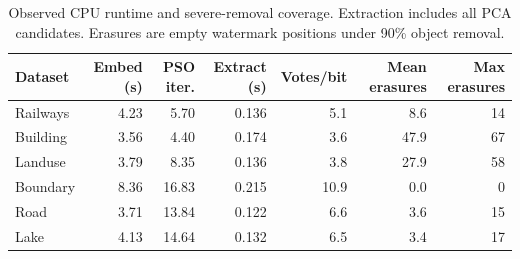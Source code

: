 \begin{table}[!t]
\centering\footnotesize
\caption{Observed CPU runtime and severe-removal coverage. Extraction includes all PCA candidates. Erasures are empty watermark positions under 90\% object removal.}
\label{tab:revised_runtime}
\begin{tabular}{lrrrrrr}
\toprule
Dataset & Embed (s) & PSO iter. & Extract (s) & Votes/bit & Mean erasures & Max erasures \\
\midrule
Railways & 4.23 & 5.70 & 0.136 & 5.1 & 8.6 & 14 \\
Building & 3.56 & 4.40 & 0.174 & 3.6 & 47.9 & 67 \\
Landuse & 3.79 & 8.35 & 0.136 & 3.8 & 27.9 & 58 \\
Boundary & 8.36 & 16.83 & 0.215 & 10.9 & 0.0 & 0 \\
Road & 3.71 & 13.84 & 0.122 & 6.6 & 3.6 & 15 \\
Lake & 4.13 & 14.64 & 0.132 & 6.5 & 3.4 & 17 \\
\bottomrule
\end{tabular}
\end{table}